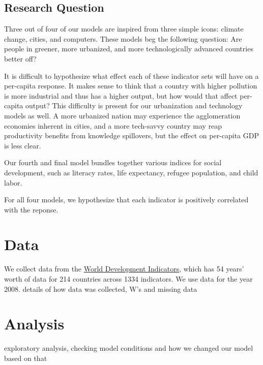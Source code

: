\documentclass[12pt, twocolumn]{article}
\begin{document}
\subsection{\sc Research Question}
Three out of four of our models are inspired from three simple icons:
climate change, cities, and computers.
These models beg the following question:
Are people in greener, more urbanized, and more technologically advanced countries better off?

It is difficult to hypothesize what effect each of these indicator sets will have on a per-capita response.
It makes sense to think that a country with higher pollution is more industrial and thus has a higher output, 
but how would that affect per-capita output? This difficulty is present for our urbanization and technology models as well.
A more urbanized nation may experience the agglomeration economies inherent in cities, and a more
tech-savvy country may reap productivity benefits from knowledge spillovers, but the effect on per-capita GDP is less clear.

Our fourth and final model bundles together various indices for social development,
such as literacy rates, life expectancy, refugee population, and child labor.

For all four models, we hypothesize that each indicator is positively correlated with the reponse.




\section{\sc Data}
We collect data from the \href{http://data.worldbank.org/indicator}{World Development Indicators}, 
which has 54 years' worth of data for 214 countries across 1334 indicators.
We use data for the year 2008.
details of how data was collected, W's and missing data




\section{\sc Analysis}
exploratory analysis, checking model conditions and how we changed our model based on that
\end{document}
